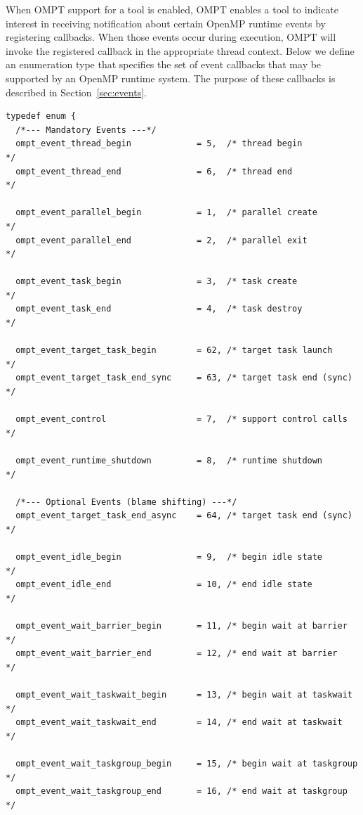 \documentclass{article}
\begin{document}
{When OMPT support for a tool is enabled, 
OMPT enables a tool to indicate interest in receiving notification about certain OpenMP runtime events by registering callbacks. When those events occur during execution, OMPT will invoke the registered callback in the appropriate thread context.
Below we define an enumeration type that specifies the set of event callbacks that may be supported by an OpenMP runtime system. 
The purpose of these callbacks is described in Section~\ref{sec:events}. 

\begin{verbatim}
typedef enum {  
  /*--- Mandatory Events ---*/
  ompt_event_thread_begin             = 5,  /* thread begin               */
  ompt_event_thread_end               = 6,  /* thread end                 */

  ompt_event_parallel_begin           = 1,  /* parallel create            */
  ompt_event_parallel_end             = 2,  /* parallel exit              */

  ompt_event_task_begin               = 3,  /* task create                */
  ompt_event_task_end                 = 4,  /* task destroy               */

  ompt_event_target_task_begin        = 62, /* target task launch         */
  ompt_event_target_task_end_sync     = 63, /* target task end (sync)     */

  ompt_event_control                  = 7,  /* support control calls      */

  ompt_event_runtime_shutdown         = 8,  /* runtime shutdown           */

  /*--- Optional Events (blame shifting) ---*/  	
  ompt_event_target_task_end_async    = 64, /* target task end (sync)     */
	    
  ompt_event_idle_begin	              = 9,  /* begin idle state           */ 
  ompt_event_idle_end                 = 10, /* end idle state             */ 

  ompt_event_wait_barrier_begin       = 11, /* begin wait at barrier      */
  ompt_event_wait_barrier_end         = 12, /* end wait at barrier        */
  
  ompt_event_wait_taskwait_begin      = 13, /* begin wait at taskwait     */
  ompt_event_wait_taskwait_end        = 14, /* end wait at taskwait       */
  
  ompt_event_wait_taskgroup_begin     = 15, /* begin wait at taskgroup    */
  ompt_event_wait_taskgroup_end       = 16, /* end wait at taskgroup      */


\end{verbatim}}
\end{document}
